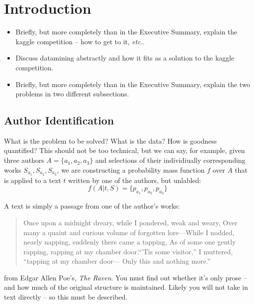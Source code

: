 \documentclass[fleqn,10pt]{SelfArx} %
\affiliation{\textsuperscript{1}\textit{Computer Science, School of Informatics, Computing, and Engineering, Indiana University, Bloomington, IN, USA}} %
\affiliation{*\textbf{Corresponding author}: jodstein@iu.edu} %
\begin{document}
\renewcommand{\abstractname}{}  
\renewcommand{\absnamepos}{} 

\flushbottom %
\maketitle %
\tableofcontents %
\thispagestyle{empty} %


\section{Introduction}

\begin{itemize}[noitemsep] %
\item Briefly, but more completely than in the Executive Summary, explain the kaggle competition -- how to get to it, \textit{etc.}.
\item   Discuss datamining abstractly and how it fits as a solution to the kaggle competition.
\item Briefly, but more completely than in the Executive Summary, explain the two problems in two different subsections.
\end{itemize}
\subsection{Author Identification}
What is the problem to be solved?  What is the data? How is goodness quantified?  This should not be too technical, but we can say, for example, given three authors $A = \{a_1, a_2, a_3\}$ and selections of their individiually corresponding works $S_{a_1}, S_{a_2}, S_{a_3}$,  we are constructing a probability  mass function $f$ over $A$ that is applied to a text $t$ written by one of the authors, but unlabled:
\begin{equation}
f(A|t,S) = \{p_{a_1}, p_{a_2}, p_{a_3}\}
\end{equation}

A text is simply a passage from one of the author's works:
\begin{quote}
Once upon a midnight dreary, while I pondered, weak and weary, Over many a quaint and curious volume of forgotten lore—While I nodded, nearly napping, suddenly there came a tapping, As of some one gently rapping, rapping at my chamber door.“’Tis some visitor,” I muttered, “tapping at my chamber door— Only this and nothing more.”
\end{quote}
from Edgar Allen Poe's, \textit{The Raven}.  You must find out whether it's only prose -- and how much of the original structure is maintained.  Likely you will not take in text directly -- so this must be described.
\end{document}
